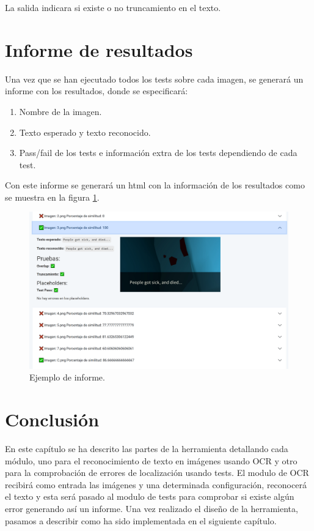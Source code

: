 La salida indicara si existe o no truncamiento en el texto.

\section{Informe de resultados}
Una vez que se han ejecutado todos los tests sobre cada imagen, se generará un informe con los resultados, donde se especificará: 
\begin{enumerate}
	\item Nombre de la imagen.
	\item Texto esperado y texto reconocido.
	\item Pass/fail de los tests e información extra de los tests dependiendo de cada test.
\end{enumerate}
Con este informe se generará un html con la información de los resultados como se muestra en la figura \ref{fig:Descripcion_Informe}.
\begin{figure}[H]
	\centering
	\includegraphics[width = 1\textwidth]{Imagenes/Des_Informe.png}
	\caption{Ejemplo de informe.}
	\label{fig:Descripcion_Informe}
\end{figure}
\section{Conclusión}
En este capítulo se ha descrito las partes de la herramienta detallando cada módulo, uno para el reconocimiento de texto en imágenes usando OCR y otro para la comprobación de errores de localización usando tests. El modulo de OCR recibirá como entrada las imágenes y una determinada configuración, reconocerá el texto y esta será pasado al modulo de tests para comprobar si existe algún error generando así un informe.
Una vez realizado el diseño de la herramienta, pasamos a describir como ha sido implementada en el siguiente capítulo.
 

